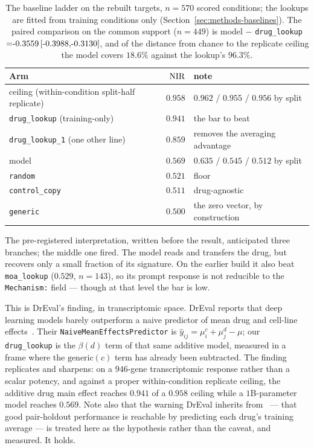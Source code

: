 \begin{table}[h]
\centering
\begin{tabular}{lrl}
\toprule
Arm & $\textrm{NIR}$ & note \\
\midrule
ceiling (within-condition split-half replicate) & $0.958$ & $0.962$ / $0.955$ / $0.956$ by split \\
\texttt{drug\_lookup} (training-only) & $0.941$ & the bar to beat \\
\texttt{drug\_lookup\_1} (one other line) & $0.859$ & removes the averaging advantage \\
model & $0.569$ & $0.635$ / $0.545$ / $0.512$ by split \\
\texttt{random} & $0.521$ & floor \\
\texttt{control\_copy} & $0.511$ & drug-agnostic \\
\texttt{generic} & $0.500$ & the zero vector, by construction \\
\bottomrule
\end{tabular}
\caption{The baseline ladder on the rebuilt targets, $n = 570$ scored conditions; the lookups are
fitted from training conditions only (Section~\ref{sec:methods-baselines}). The paired comparison
on the common support ($n = 449$) is model $-$ \texttt{drug\_lookup} $= \ci{-0.3559}{-0.3988}{-0.3130}$,
and of the distance from chance to the replicate ceiling the model covers $18.6\%$ against the
lookup's $96.3\%$.}
\label{tab:lookup}
\end{table}

The pre-registered interpretation, written before the result, anticipated three branches; the middle
one fired. The model reads and transfers the drug, but recovers only a small fraction of its
signature. On the earlier build it also beat \texttt{moa\_lookup} ($0.529$, $n = 143$), so its
prompt response is not reducible to the \texttt{Mechanism:} field --- though at that level the bar
is low.

This is DrEval's finding, in transcriptomic space. DrEval reports that deep learning models barely
outperform a naive predictor of mean drug and cell-line effects~\cite{dreval}. Their
\texttt{NaiveMeanEffectsPredictor} is $\hat{y}_{ij} = \mu^c_i + \mu^d_j - \mu$; our
\texttt{drug\_lookup} is the $\beta(d)$ term of that same additive model, measured in a frame where
the $\textrm{generic}(c)$ term has already been subtracted. The finding replicates and sharpens: on
a $946$-gene transcriptomic response rather than a scalar potency, and against a proper
within-condition replicate ceiling, the additive drug main effect reaches $0.941$ of a $0.958$
ceiling while a $1$B-parameter model reaches $0.569$. Note also that the warning DrEval inherits
from~\cite{partin} --- that good pair-holdout performance is reachable by predicting each drug's
training average --- is treated here as the hypothesis rather than the caveat, and measured. It
holds.

